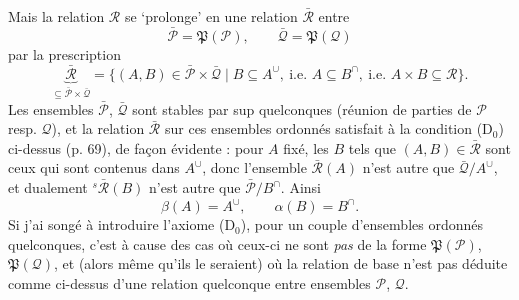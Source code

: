 \documentclass[11pt]{article}
\newcommand{\printedpage}[1]{\marginpar{\footnotesize p.~#1}}
\newcommand{\msp}[1]{\marginpar{\footnotesize [#1]}}
\newcommand{\cP}{\mathcal{P}}
\newcommand{\cQ}{\mathcal{Q}}
\newcommand{\cR}{\mathcal{R}}
\newcommand{\fP}{\mathfrak{P}}
\begin{document}
Mais la relation $\cR$ se `prolonge' en une relation $\bar{\cR}$ entre
\[
\bar{\cP} = \fP(\cP), \qquad \bar{\cQ} = \fP(\cQ)
\tag*{(5.13)}
\]
par la prescription
\[
\underbrace{\bar{\cR}}_{\subseteq \bar{\cP} \times \bar{\cQ}} = \{(A,B) \in \bar{\cP} \times \bar{\cQ} \mid B \subseteq A^{\cup},\ \text{i.e. } A \subseteq B^{\cap},\ \text{i.e. } A \times B \subseteq \cR\}.
\tag*{(5.14)}
\]
Les ensembles $\bar{\cP}$, $\bar{\cQ}$ sont stables par sup quelconques (réunion de parties de $\cP$ resp. $\cQ$), et la relation $\bar{\cR}$ sur ces ensembles ordonnés satisfait à la condition (D$_0$)
\printedpage{46}
\msp{74}
ci-dessus (p. 69), de façon évidente : pour $A$ fixé, les $B$ tels que $(A,B) \in \bar{\cR}$ sont ceux qui sont contenus dans $A^{\cup}$, donc l'ensemble $\bar{\cR}(A)$ n'est autre que $\bar{\cQ}/A^{\cup}$, et dualement ${}^{s}\bar{\cR}(B)$ n'est autre que $\bar{\cP}/B^{\cap}$. Ainsi
\[
\beta(A) = A^{\cup}, \qquad \alpha(B) = B^{\cap}.
\tag*{(5.14)} %
\]
Si j'ai songé à introduire l'axiome (D$_0$), pour un couple d'ensembles ordonnés quelconques, c'est à cause des cas où ceux-ci ne sont \textit{pas} de la forme $\fP(\cP)$, $\fP(\cQ)$, et (alors même qu'ils le seraient) où la relation de base n'est pas déduite comme ci-dessus d'une relation quelconque entre ensembles $\cP$, $\cQ$.
\end{document}
